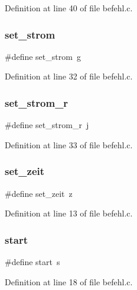 Definition at line 40 of file befehl.\+c.

\mbox{\label{befehl_8c_a818b26ddeedf1d2f0b3ce33f23811449}} 
\subsubsection{set\+\_\+strom}
{\footnotesize\ttfamily \#define set\+\_\+strom~\textquotesingle{}g\textquotesingle{}}



Definition at line 32 of file befehl.\+c.

\mbox{\label{befehl_8c_a28456fbb93ecd69742e02d75761fe29d}} 
\subsubsection{set\+\_\+strom\+\_\+r}
{\footnotesize\ttfamily \#define set\+\_\+strom\+\_\+r~\textquotesingle{}j\textquotesingle{}}



Definition at line 33 of file befehl.\+c.

\mbox{\label{befehl_8c_af0af544c7b6c97a94c6a8eef76687a49}} 
\subsubsection{set\+\_\+zeit}
{\footnotesize\ttfamily \#define set\+\_\+zeit~\textquotesingle{}z\textquotesingle{}}



Definition at line 13 of file befehl.\+c.

\mbox{\label{befehl_8c_a317b24157e7f590740c6e329bfe668dc}} 
\subsubsection{start}
{\footnotesize\ttfamily \#define start~\textquotesingle{}s\textquotesingle{}}



Definition at line 18 of file befehl.\+c.

\mbox{\label{befehl_8c_ae48a1c0f252dd523b1ce191708de6f45}} 
